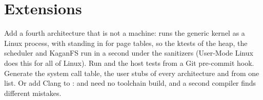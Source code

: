 \documentclass[11pt,a4paper]{article}
\begin{document}
\section{Extensions}

Add a fourth architecture that is not a machine:  runs the generic kernel as a Linux process,
with  standing in for page tables, so the ktests of the heap, the scheduler and KaganFS run in a second under
the sanitizers (User-Mode Linux does this for all of Linux). Run  and the host tests from a
Git pre-commit hook. Generate the system call table, the user stubs of every architecture and 
from one list. Or add Clang to :  and
 need no toolchain build, and a second compiler finds different mistakes.

\booklegend
\portlegend
\end{document}
